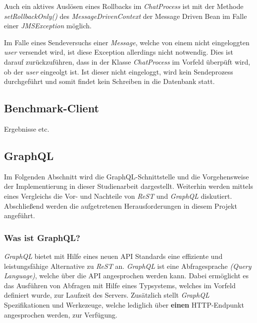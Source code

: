 \documentclass[10pt,journal,compsoc]{IEEEtran}
\begin{document}
Auch ein aktives Auslösen eines Rollbacks im \textit{ChatProcess} ist mit der Methode \textit{setRollbackOnly()} des \textit{MessageDrivenContext} der Message Driven Bean im Falle einer \textit{JMSException} möglich. 

Im Falle eines Sendeversuchs einer \textit{Message}, welche von einem nicht eingeloggten \textit{user} versendet wird, ist diese Exception allerdings nicht notwendig. Dies ist darauf zurückzuführen, dass in der Klasse \textit{ChatProcess} im Vorfeld überpüft wird, ob der \textit{user} eingeolgt ist. Ist dieser nicht eingeloggt, wird kein Sendeprozess durchgeführt und somit findet kein Schreiben in die Datenbank statt. 


\subsection{Benchmark-Client}
Ergebnisse etc. 


\subsection{GraphQL}
Im Folgenden Abschnitt wird die GraphQL-Schnittstelle  und die Vorgehensweise der Implementierung in dieser Studienarbeit dargestellt. Weiterhin werden mittels eines Vergleichs die Vor- und Nachteile von \textit{ReST} und \textit{GraphQL} diskutiert. Abschließend werden die aufgetretenen Herausforderungen in diesem Projekt angeführt.


\subsubsection{Was ist GraphQL?}
\textit{GraphQL} bietet mit Hilfe eines neuen API Standards eine effiziente und leistungsfähige Alternative zu \textit{ReST} an. \textit{GraphQL} ist eine Abfragesprache \textit{(Query Language)}, welche über die API angesprochen werden kann. Dabei ermöglicht es das Ausführen von Abfragen mit Hilfe eines Typsystems, welches im Vorfeld definiert wurde, zur Laufzeit des Servers. Zusätzlich stellt \textit{GraphQL} Spezifikationen und Werkezeuge, welche lediglich über \textbf{einen} HTTP-Endpunkt angesprochen werden, zur Verfügung. \cite{GraphQL:Introduction}
\end{document}
